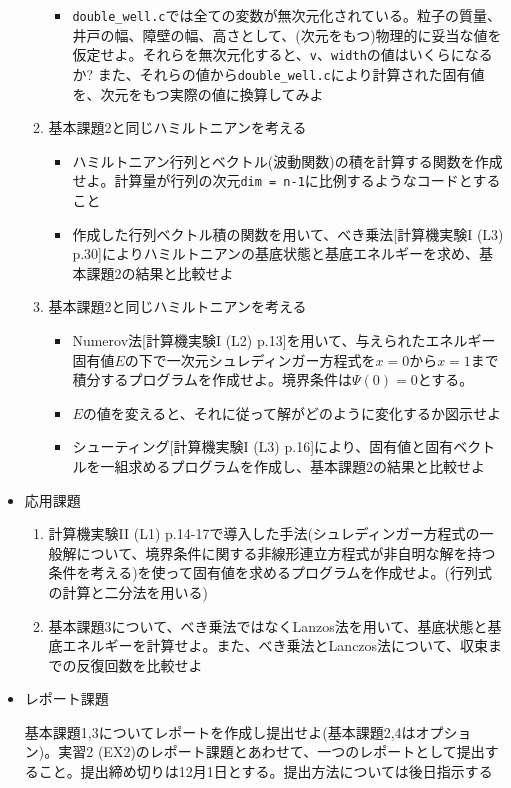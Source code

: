 \documentclass[11pt]{jarticle}
\begin{document}
\begin{itemize}
\begin{enumerate}
\begin{itemize}
      \item {\tt double\_well.c}では全ての変数が無次元化されている。粒子の質量、井戸の幅、障壁の幅、高さとして、(次元をもつ)物理的に妥当な値を仮定せよ。それらを無次元化すると、{\tt v}、{\tt width}の値はいくらになるか? また、それらの値から{\tt double\_well.c}により計算された固有値を、次元をもつ実際の値に換算してみよ
    \end{itemize}
  \item 基本課題2と同じハミルトニアンを考える
    \begin{itemize}
      \item ハミルトニアン行列とベクトル(波動関数)の積を計算する関数を作成せよ。計算量が行列の次元{\tt dim = n-1}に比例するようなコードとすること
      \item 作成した行列ベクトル積の関数を用いて、べき乗法[計算機実験I (L3) p.30]によりハミルトニアンの基底状態と基底エネルギーを求め、基本課題2の結果と比較せよ
    \end{itemize}
  \item 基本課題2と同じハミルトニアンを考える
     \begin{itemize}
     \item Numerov法[計算機実験I (L2) p.13]を用いて、与えられたエネルギー固有値$E$の下で一次元シュレディンガー方程式を$x=0$から$x=1$まで積分するプログラムを作成せよ。境界条件は$\Psi(0)=0$とする。%
     \item $E$の値を変えると、それに従って解がどのように変化するか図示せよ
     \item シューティング[計算機実験I (L3) p.16]により、固有値と固有ベクトルを一組求めるプログラムを作成し、基本課題2の結果と比較せよ
    \end{itemize}
  \end{enumerate}  
\item 応用課題
  \begin{enumerate}
  \item 計算機実験II (L1) p.14-17で導入した手法(シュレディンガー方程式の一般解について、境界条件に関する非線形連立方程式が非自明な解を持つ条件を考える)を使って固有値を求めるプログラムを作成せよ。(行列式の計算と二分法を用いる)
  \item 基本課題3について、べき乗法ではなくLanzos法を用いて、基底状態と基底エネルギーを計算せよ。また、べき乗法とLanczos法について、収束までの反復回数を比較せよ
  \end{enumerate}  

\item レポート課題

  基本課題1,3についてレポートを作成し提出せよ(基本課題2,4はオプション)。実習2 (EX2)のレポート課題とあわせて、一つのレポートとして提出すること。提出締め切りは12月1日とする。提出方法については後日指示する
  
\end{itemize}
\end{document}
